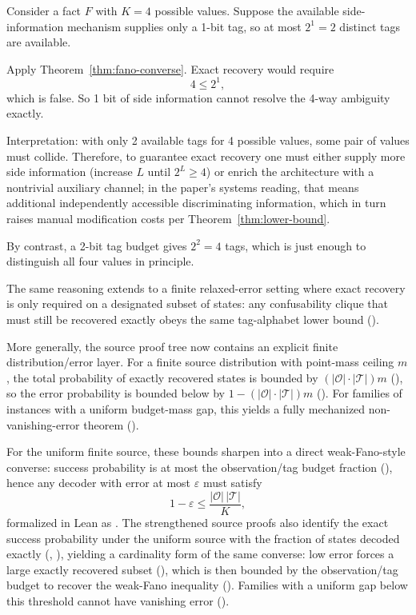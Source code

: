 Consider a fact $F$ with $K=4$ possible values. Suppose the available side-information mechanism supplies only a 1-bit tag, so at most $2^1=2$ distinct tags are available.

Apply Theorem~\ref{thm:fano-converse}. Exact recovery would require
\[
4 \le 2^1,
\]
which is false. So 1 bit of side information cannot resolve the 4-way ambiguity exactly.

Interpretation: with only 2 available tags for 4 possible values, some pair of values must collide. Therefore, to guarantee exact recovery one must either supply more side information (increase $L$ until $2^L\ge 4$) or enrich the architecture with a nontrivial auxiliary channel; in the paper's systems reading, that means additional independently accessible discriminating information, which in turn raises manual modification costs per Theorem~\ref{thm:lower-bound}.

By contrast, a 2-bit tag budget gives $2^2=4$ tags, which is just enough to distinguish all four values in principle.

The same reasoning extends to a finite relaxed-error setting where exact recovery is only required on a designated subset of states: any confusability clique that must still be recovered exactly obeys the same tag-alphabet lower bound ().

More generally, the source proof tree now contains an explicit finite distribution/error layer. For a finite source distribution with point-mass ceiling $m$, the total probability of exactly recovered states is bounded by $(|\mathcal O|\cdot |\mathcal T|)m$ (), so the error probability is bounded below by $1-(|\mathcal O|\cdot |\mathcal T|)m$ (). For families of instances with a uniform budget-mass gap, this yields a fully mechanized non-vanishing-error theorem ().

For the uniform finite source, these bounds sharpen into a direct weak-Fano-style converse: success probability is at most the observation/tag budget fraction (), hence any decoder with error at most $\varepsilon$ must satisfy
\[
1-\varepsilon \le \frac{|\mathcal O|\,|\mathcal T|}{K},
\]
formalized in Lean as . The strengthened source proofs also identify the exact success probability under the uniform source with the fraction of states decoded exactly (, ), yielding a cardinality form of the same converse: low error forces a large exactly recovered subset (), which is then bounded by the observation/tag budget to recover the weak-Fano inequality (). Families with a uniform gap below this threshold cannot have vanishing error ().

